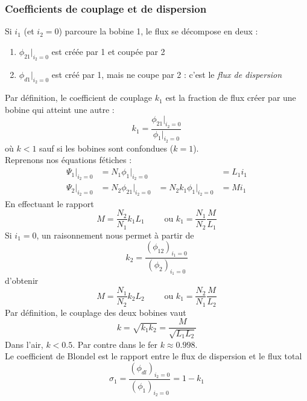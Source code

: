 		\subsubsection{Coefficients de couplage et de dispersion}
		Si $i_1$ (et $i_2=0$) parcoure la bobine 1, le flux se décompose en deux :
		\begin{enumerate}
		\item $\phi_{21}|_{i_2=0}$ est créée par 1 et coupée par 2
		\item $\phi_{d1}|_{i_2=0}$ est créé par 1, mais ne coupe par 2 : c'est le 
		\textit{flux de dispersion}
		\end{enumerate}
		Par définition, le coefficient de couplage $k_1$ est la fraction de flux 
		créer par une bobine qui atteint une autre :
		\begin{equation}
		k_1 = \frac{\phi_{21}|_{i_2=0}}{\phi_1|_{i_2=0}}
		\end{equation}
		où $k<1$ sauf si les bobines sont confondues ($k=1$).\\
		Reprenons nos équations fétiches :
		\begin{equation}
		\begin{array}{llll}
		\Psi_1|_{i_2=0} &= N_1\phi_1|_{i_2=0}& &= L_1i_1\\
		\Psi_2|_{i_2=0} &= N_2\phi_{21}|_{i_2=0}&= N_2k_1\phi_1|_{i_2=0} &= Mi_1		
		\end{array}
		\end{equation}
		En effectuant le rapport 
		\begin{equation}
		M = \frac{N_2}{N_1}k_1L_1\qquad \text{ ou } k_1 = \frac{N_1}{N_2}\frac{M}{L_1}
		\end{equation}
		Si $i_1=0$, un raisonnement nous permet à partir de 
		\begin{equation}
		k_2 = \frac{(\phi_{12})_{i_1=0}}{(\phi_2)_{i_1=0}}
		\end{equation}
		d'obtenir 
		\begin{equation}
		M = \frac{N_1}{N_2}k_2L_2\qquad \text{ ou } k_1 = \frac{N_2}{N_1}\frac{M}{L_2}
		\end{equation}	
		Par définition, le couplage des deux bobines vaut
		\begin{equation}
		k = \sqrt{k_1k_2} = \frac{M}{\sqrt{L_1L_2}}
		\end{equation}
		Dans l'air, $k<0.5$. Par contre dans le fer $k \approx 0.998$.\\
		Le coefficient de Blondel est le rapport entre le flux de dispersion et le flux 
		total
		\begin{equation}
		\sigma_1 = \frac{(\phi_{dl})_{i_2=0}}{(\phi_1)_{i_2=0}} = 1-k_1
		\end{equation}
		
